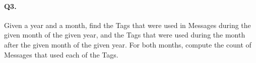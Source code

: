 \paragraph{Q3.}
Given a year and a month, find the Tags that were used in Messages
during the given month of the given year, and the Tags that were used
during the month after the given month of the given year.
For both months, compute the count of Messages that used each of the
Tags.
